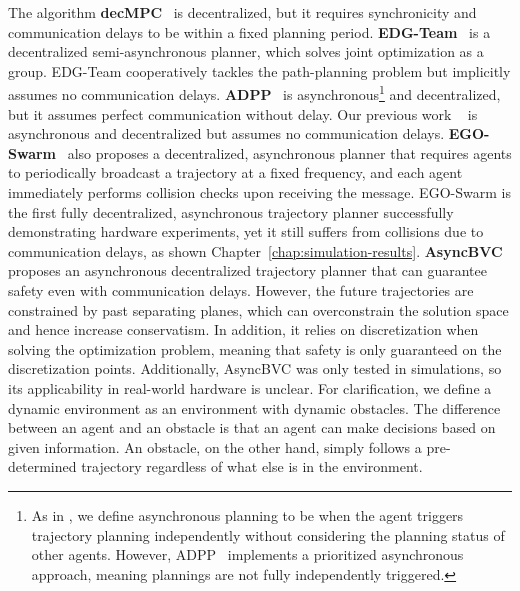 The algorithm \textbf{decMPC}~\cite{toumieh_decentralized_2022} is decentralized, but it requires synchronicity and communication delays to be within a fixed planning period.
\textbf{EDG-Team}~\cite{Hou2022EnhancedDA} is a decentralized semi-asynchronous planner, which solves joint optimization as a group. 
EDG-Team cooperatively tackles the path-planning problem but implicitly assumes no communication delays. 
\textbf{ADPP}~\cite{cap_asynchronous_2013} is asynchronous\footnote{As in \cite{tordesillas2020mader}, we define asynchronous planning to be when the agent triggers trajectory planning independently without considering the planning status of other agents. 
However, ADPP~\cite{cap_asynchronous_2013} implements a prioritized asynchronous approach, meaning plannings are not fully independently triggered.} and decentralized, but it assumes perfect communication without delay. 
Our previous work \MADER{}~\cite{tordesillas2020mader} is asynchronous and decentralized but assumes no communication delays.
\textbf{EGO-Swarm}~\cite{zhou2020ego-swarm} also proposes a decentralized, asynchronous planner that requires agents to periodically broadcast a trajectory at a fixed frequency, and each agent immediately performs collision checks upon receiving the message. EGO-Swarm is the first fully decentralized, asynchronous trajectory planner successfully demonstrating hardware experiments, yet it still suffers from collisions due to communication delays, as shown Chapter~\ref{chap:simulation-results}. 
\textbf{AsyncBVC}~\cite{senbaslar_asynchronous_2022} proposes an asynchronous decentralized trajectory planner that can guarantee safety even with communication delays.
However, the future trajectories are constrained by past separating planes, which can overconstrain the solution space and hence increase conservatism.
In addition, it relies on discretization when solving the optimization problem, meaning that safety is only guaranteed on the discretization points. Additionally, AsyncBVC was only tested in simulations, so its applicability in real-world hardware is unclear. 
For clarification, we define a dynamic environment as an environment with dynamic obstacles. The difference between an agent and an obstacle is that an agent can make decisions based on given information. An obstacle, on the other hand, simply follows a pre-determined trajectory regardless of what else is in the environment.

